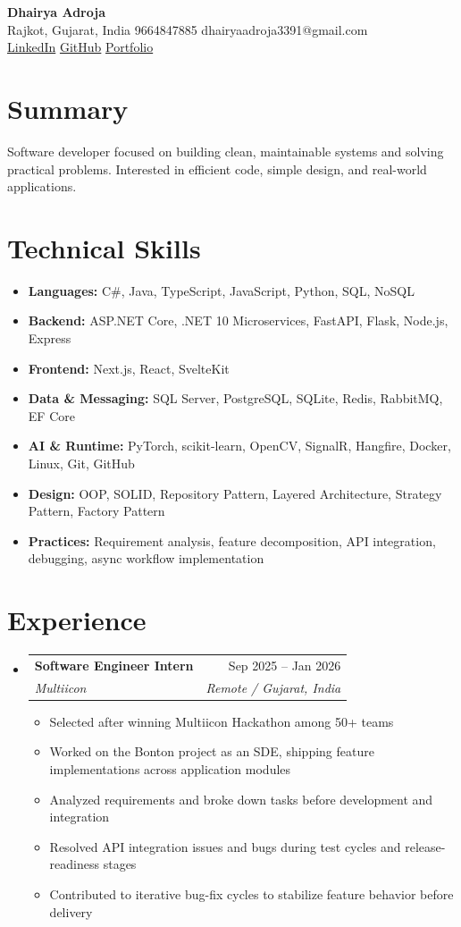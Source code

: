 \documentclass[11pt,a4paper]{article}
\makeatletter
\newcommand{\resumeSubheading}[4]{
  \vspace{-1pt}\item
    \begin{tabular*}{0.97\textwidth}[t]{l@{\extracolsep{\fill}}r}
      \textbf{#1} & #2 \\
      \textit{#3} & \textit{#4} \\
    \end{tabular*}\vspace{-3pt}
}
\newcommand{\resumeItem}[1]{
  \item\small{#1 \vspace{-1pt}}
}
\makeatother
\begin{document}
\begin{center}
    {\huge \textbf{Dhairya Adroja}} \\
    \vspace{8pt}
    \small Rajkot, Gujarat, India \textbar{} 9664847885 \textbar{} dhairyaadroja3391@gmail.com \\
    \small
    \href{https://www.linkedin.com/in/adrojadhairya}{LinkedIn} \textbar{}
    \href{https://www.github.com/Dhairya3391}{GitHub} \textbar{}
    \href{https://dhairya.codes}{Portfolio}
\end{center}

\section{Summary}
\noindent Software developer focused on building clean, maintainable systems and solving practical problems. Interested in efficient code, simple design, and real-world applications.

\section{Technical Skills}
\begin{itemize}[leftmargin=*]
  \resumeItem{\textbf{Languages:} C\#, Java, TypeScript, JavaScript, Python, SQL, NoSQL}
  \resumeItem{\textbf{Backend:} ASP.NET Core, .NET 10 Microservices, FastAPI, Flask, Node.js, Express}
  \resumeItem{\textbf{Frontend:} Next.js, React, SvelteKit}
  \resumeItem{\textbf{Data \& Messaging:} SQL Server, PostgreSQL, SQLite, Redis, RabbitMQ, EF Core}
  \resumeItem{\textbf{AI \& Runtime:} PyTorch, scikit-learn, OpenCV, SignalR, Hangfire, Docker, Linux, Git, GitHub}
  \resumeItem{\textbf{Design:} OOP, SOLID, Repository Pattern, Layered Architecture, Strategy Pattern, Factory Pattern}
  \resumeItem{\textbf{Practices:} Requirement analysis, feature decomposition, API integration, debugging, async workflow implementation}
\end{itemize}

\section{Experience}
\begin{itemize}[leftmargin=*]

\resumeSubheading
{Software Engineer Intern}{Sep 2025 -- Jan 2026}
{Multiicon}{Remote / Gujarat, India}
\begin{itemize}[leftmargin=*]
  \resumeItem{Selected after winning Multiicon Hackathon among 50+ teams}
  \resumeItem{Worked on the Bonton project as an SDE, shipping feature implementations across application modules}
  \resumeItem{Analyzed requirements and broke down tasks before development and integration}
  \resumeItem{Resolved API integration issues and bugs during test cycles and release-readiness stages}
  \resumeItem{Contributed to iterative bug-fix cycles to stabilize feature behavior before delivery}
\end{itemize}

\end{itemize}
\end{document}
